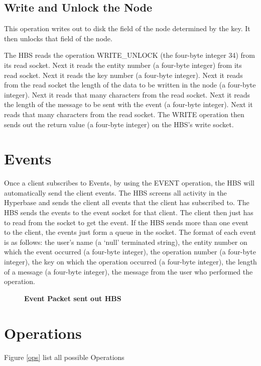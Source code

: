 \subsection{Write and Unlock the Node}

This operation writes out to disk the field of the node determined by the
key.  It then unlocks that field of the node.

The HBS reads the operation WRITE\_UNLOCK (the four-byte integer 34) from
its read socket.  Next it reads the entity number (a four-byte integer)
from its read socket.  Next it reads the key number (a four-byte integer).
Next it reads from the read socket the length of the data to be written in
the node (a four-byte integer).  Next it reads that many characters from
the read socket.  Next it reads the length of the message to be sent with
the event (a four-byte integer).  Next it reads that many characters from
the read socket.  The WRITE operation then sends out the return value (a
four-byte integer) on the HBS's write socket.

\newpage
\section{Events}

Once a client subscribes to Events, by using the EVENT operation, the HBS
will automatically send the client events.  The HBS screens all activity in
the Hyperbase and sends the client all events that the client has
subscribed to.  The HBS sends the events to the event socket for that
client.  The client then just has to read from the socket to get the event.
If the HBS sends more than one event to the client, the events just form a
queue in the socket.  The format of each event is as follows: the user's
name (a `null' terminated string), the entity number on which the event
occurred (a four-byte integer), the operation number (a four-byte integer),
the key on which the operation occurred (a four-byte integer), the length of
a message (a four-byte integer), the message from the user who performed
the operation.



\begin{figure}[htb]
  \centerline{}
  \caption{{\bf Event Packet sent out HBS}}
  \label{fig:Event3}
\end{figure}


\section{Operations}
Figure \ref{ops} list all possible Operations
\small

